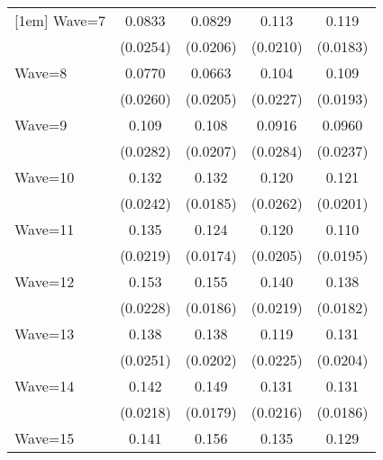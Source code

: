 {\begin{tabular}{l*{4}{c}}
[1em]
Wave=7              &      0.0833\sym{**} &      0.0829\sym{***}&       0.113\sym{***}&       0.119\sym{***}\\
                    &    (0.0254)         &    (0.0206)         &    (0.0210)         &    (0.0183)         \\
[1em]
Wave=8              &      0.0770\sym{**} &      0.0663\sym{**} &       0.104\sym{***}&       0.109\sym{***}\\
                    &    (0.0260)         &    (0.0205)         &    (0.0227)         &    (0.0193)         \\
[1em]
Wave=9              &       0.109\sym{***}&       0.108\sym{***}&      0.0916\sym{**} &      0.0960\sym{***}\\
                    &    (0.0282)         &    (0.0207)         &    (0.0284)         &    (0.0237)         \\
[1em]
Wave=10             &       0.132\sym{***}&       0.132\sym{***}&       0.120\sym{***}&       0.121\sym{***}\\
                    &    (0.0242)         &    (0.0185)         &    (0.0262)         &    (0.0201)         \\
[1em]
Wave=11             &       0.135\sym{***}&       0.124\sym{***}&       0.120\sym{***}&       0.110\sym{***}\\
                    &    (0.0219)         &    (0.0174)         &    (0.0205)         &    (0.0195)         \\
[1em]
Wave=12             &       0.153\sym{***}&       0.155\sym{***}&       0.140\sym{***}&       0.138\sym{***}\\
                    &    (0.0228)         &    (0.0186)         &    (0.0219)         &    (0.0182)         \\
[1em]
Wave=13             &       0.138\sym{***}&       0.138\sym{***}&       0.119\sym{***}&       0.131\sym{***}\\
                    &    (0.0251)         &    (0.0202)         &    (0.0225)         &    (0.0204)         \\
[1em]
Wave=14             &       0.142\sym{***}&       0.149\sym{***}&       0.131\sym{***}&       0.131\sym{***}\\
                    &    (0.0218)         &    (0.0179)         &    (0.0216)         &    (0.0186)         \\
[1em]
Wave=15             &       0.141\sym{***}&       0.156\sym{***}&       0.135\sym{***}&       0.129\sym{***}\\

\end{tabular}}
